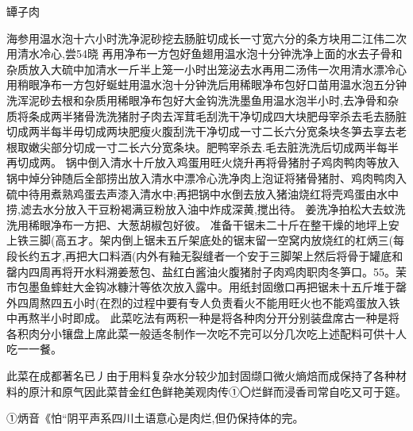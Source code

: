 \begin{recipe}{罈子肉}

\ingredients


\cooking

\step 海参用温水泡十六小时洗净泥砂挖去肠脏切成长一寸宽六分的条方块用二江伟二次用清水冷心,尝54晓
再用净布一方包好鱼翅用温水泡十分钟洗净上面的水去子骨和杂质放入大硫中加清水一斤半上笼一小时出笼泌去水再用二汤伟一次用清水漂冷心用稍眼净布一方包好蜒蛀用温水泡十分钟洗后用稀眼净布包好口苗用温水泡五分钟洗浑泥砂去根和杂质用稀眼净布包好大金钩洗洗墨鱼用温水泡半小时,去净骨和杂质将条成两半猪骨洗洗猪肘子肉去浑茸毛刮洗干净切成四大块肥母宰杀去毛去肠脏切成两半每半毋切成两块肥瘦火腹刮洗干净切成一寸二长六分宽条块冬笋去享去老根取嫩尖部分切成一寸二长六分宽条块。肥鸭宰杀去.毛去脏洗洗后切成两半每半再切成两。
\step 锅中倒入清水十斤放入鸡蛋用旺火烧升再将骨猪肘子鸡肉鸭肉等放入锅中焯分钟随后全部捞出放入清水中漂冷心洗净肉上泡证将猪骨猪肘、鸡肉鸭肉入硫中待用煮熟鸡蛋去声漆入清水中;再把锅中水倒去放入猪油烧红将壳鸡蛋由水中捞,滤去水分放入干豆粉褐满豆粉放入油中炸成深黄,搅出待。
\step 姜洗净拍松大去蚊洗洗用稀眼净布一方把、大葱胡椒包好彼。
\step 准备干锯未二十斤在整干燥的地坪上安上铁三脚(高五才。架内倒上锯未五斤架底处的锯末留一空窝内放烧红的杠炳三(每段长约五才,再把大口料酒(内外有釉无裂缝者一个安于三脚架上然后将骨于罐底和罄内四周再将开水料溯姜葱包、盐红白酱油火腹猪肘子肉鸡肉职肉冬笋口。55。茉市包墨鱼蟀蛀大金钩冰糠汁等依次放入露中。用纸封固缴口再把锯未十五斤堆于罄外四周熬四五小时(在烈的过程中要有专人负责看火不能用旺火也不能鸡蛋放入铁中再熬半小时即成。
\step 此菜吃法有两积一种是将各种肉分开分别装盘席古一种是将各积肉分小镶盘上席此菜一般适冬制作一次吃不完可以分几次吃上述配料可供十人吃一一餐。

\notes

此菜在成都著名已丿由于用料复杂水分较少加封固缬口微火熵焙而成保持了各种材料的原汁和原气因此菜昔金红色鲜艳美观肉传①〇烂鲜而浸香司常自吃又可于筵。

①炳音《怕“阴平声系四川土语意心是肉烂,但仍保持体的完。

\end{recipe}

